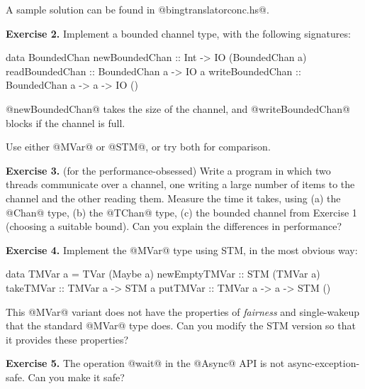 \documentclass[11pt,a4paper]{article}
\begin{document}
A sample solution can be found in @bingtranslatorconc.hs@.

\textbf{Exercise 2.} Implement a bounded channel type, with the
following signatures:

\begin{haskell}
data BoundedChan
newBoundedChan  :: Int -> IO (BoundedChan a)
readBoundedChan :: BoundedChan a -> IO a
writeBoundedChan :: BoundedChan a -> a -> IO ()
\end{haskell}

\noindent @newBoundedChan@ takes the size of the channel, and
@writeBoundedChan@ blocks if the channel is full.

Use either @MVar@ or @STM@, or try both for comparison.

\textbf{Exercise 3.} (for the performance-obsessed) Write a program in which
two threads communicate over a channel, one writing a large number of
items to the channel and the other reading them.  Measure the time it
takes, using (a) the @Chan@ type, (b) the @TChan@ type, (c) the
bounded channel from Exercise 1 (choosing a suitable bound).  Can you
explain the differences in performance?

\textbf{Exercise 4.} Implement the @MVar@ type using STM, in the most
obvious way:

\begin{haskell}
data TMVar a = TVar (Maybe a)
newEmptyTMVar :: STM (TMVar a)
takeTMVar     :: TMVar a -> STM a
putTMVar      :: TMVar a -> a -> STM ()
\end{haskell}

This @MVar@ variant does not have the properties of \emph{fairness}
and {single-wakeup} that the standard @MVar@ type does.  Can you
modify the STM version so that it provides these properties?

\textbf{Exercise 5.} The operation @wait@ in the @Async@ API is not
async-exception-safe.  Can you make it safe?

\end{document}
